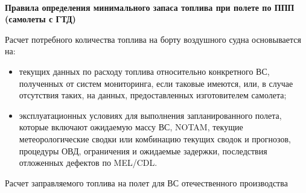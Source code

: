 \paragraph{} \textbf{Правила определения минимального запаса топлива при полете по ППП (самолеты с ГТД)}

Расчет потребного количества топлива на борту воздушного судна основывается на:
\begin{itemize}
    \item текущих данных по расходу топлива относительно конкретного ВС, полученных от систем мониторинга, если таковые имеются, или, в случае отсутствия таких, на данных, предоставленных изготовителем самолета;
    \item эксплуатационных условиях для выполнения запланированного полета, которые включают ожидаемую массу ВС, NOTAM, текущие метеорологические сводки или комбинацию текущих сводок и прогнозов, процедуры ОВД, ограничения и ожидаемые задержки, последствия отложенных дефектов по MEL/CDL.
\end{itemize}

Расчет заправляемого топлива на полет для ВС отечественного производства

